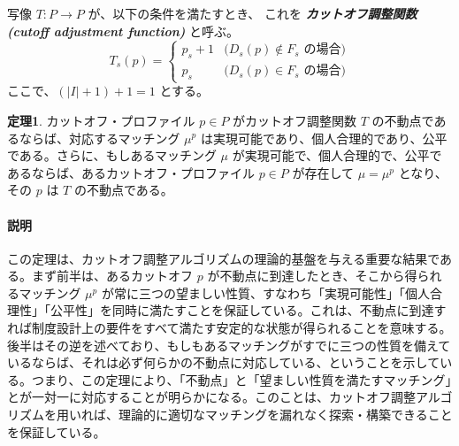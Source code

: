 \documentclass[12pt, a4paper]{article}
\theoremstyle{definition}
\theoremstyle{remark}
\theoremstyle{plain}
\begin{document}



写像 $T: P \to P$ が、以下の条件を満たすとき、
これを \textbf{\textit{カットオフ調整関数 (cutoff adjustment function)}} と呼ぶ。
\[
    T_s(p) =
    \begin{cases}
        p_s + 1 & \text{($D_s(p) \notin F_s$ の場合)} \\
        p_s     & \text{($D_s(p) \in F_s$ の場合)}
    \end{cases}
\]
ここで、\( (|I| + 1) + 1 = 1 \) とする。


\textbf{定理1}. カットオフ・プロファイル $p \in P$ がカットオフ調整関数 $T$ の不動点であるならば、対応するマッチング $\mu^p$ は実現可能であり、個人合理的であり、公平である。さらに、もしあるマッチング $\mu$ が実現可能で、個人合理的で、公平であるならば、あるカットオフ・プロファイル $p \in P$ が存在して $\mu = \mu^p$ となり、その $p$ は $T$ の不動点である。


\paragraph{説明}
この定理は、カットオフ調整アルゴリズムの理論的基盤を与える重要な結果である。まず前半は、あるカットオフ $p$ が不動点に到達したとき、そこから得られるマッチング $\mu^p$ が常に三つの望ましい性質、すなわち「実現可能性」「個人合理性」「公平性」を同時に満たすことを保証している。これは、不動点に到達すれば制度設計上の要件をすべて満たす安定的な状態が得られることを意味する。後半はその逆を述べており、もしもあるマッチングがすでに三つの性質を備えているならば、それは必ず何らかの不動点に対応している、ということを示している。つまり、この定理により、「不動点」と「望ましい性質を満たすマッチング」とが一対一に対応することが明らかになる。このことは、カットオフ調整アルゴリズムを用いれば、理論的に適切なマッチングを漏れなく探索・構築できることを保証している。
\end{document}
